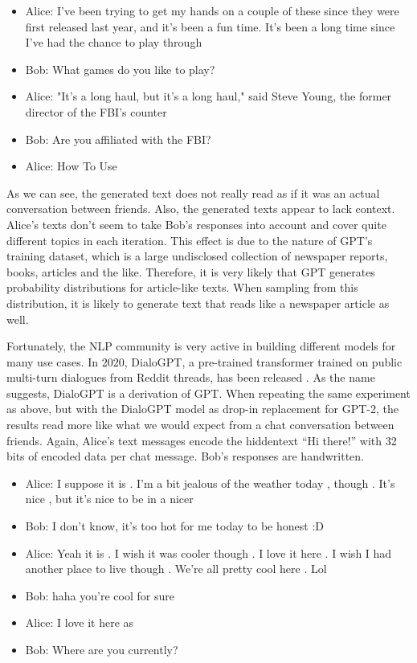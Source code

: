 \begin{example}
\leavevmode
\begin{itemize}
\item Alice: I've been trying to get my hands on a couple of these since they were first released last year, and it's been a fun time. It's been a long time since I've had the chance to play through
\item Bob: What games do you like to play?
\item Alice: "It's a long haul, but it's a long haul," said Steve Young, the former director of the FBI's counter
\item Bob: Are you affiliated with the FBI?
\item Alice: How To Use
\end{itemize}
\end{example}

As we can see, the generated text does not really read as if it was an actual conversation between friends.
Also, the generated texts appear to lack context.
Alice's texts don't seem to take Bob's responses into account and cover quite different topics in each iteration.
This effect is due to the nature of GPT's training dataset, which is a large undisclosed collection of newspaper reports, books, articles and the like.
Therefore, it is very likely that GPT generates probability distributions for article-like texts.
When sampling from this distribution, it is likely to generate text that reads like a newspaper article as well.

Fortunately, the NLP community is very active in building different models for many use cases.
In 2020, DialoGPT, a pre-trained transformer trained on public multi-turn dialogues from Reddit threads, has been released \cite{Zhang2020}.
As the name suggests, DialoGPT is a derivation of GPT.
When repeating the same experiment as above, but with the DialoGPT model as drop-in replacement for GPT-2, the results read more like what we would expect from a chat conversation between friends.
Again, Alice's text messages encode the hiddentext ``Hi there!'' with 32 bits of encoded data per chat message.
Bob's responses are handwritten.

\begin{example}
\leavevmode
\begin{itemize}
\item Alice: I suppose it is . I'm a bit jealous of the weather today , though . It's nice , but it's nice to be in a nicer
\item Bob:   I don't know, it's too hot for me today to be honest :D
\item Alice: Yeah it is . I wish it was cooler though . I love it here . I wish I had another place to live though . We're all pretty cool here . Lol
\item Bob:   haha you're cool for sure
\item Alice: I love it here as
\item Bob:   Where are you currently?
\end{itemize}


\end{example}
